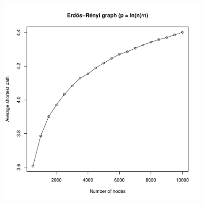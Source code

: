 \documentclass[12pt,a4paper]{article}
\begin{document}
\begin{center}
\includegraphics[width=0.8\textwidth]{er.pdf}
\end{center}
\end{document}
